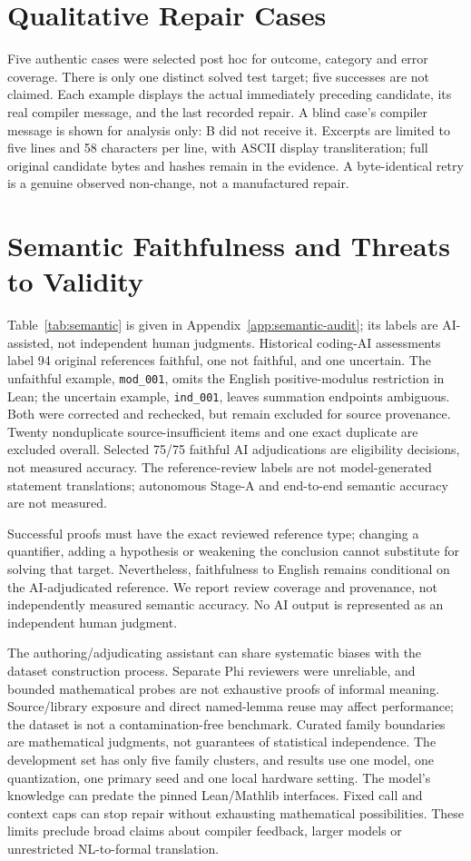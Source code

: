 \documentclass[runningheads,a4paper]{llncs}
\begin{document}
\section{Qualitative Repair Cases}
Five authentic cases were selected post hoc for outcome, category and error
coverage. There is only one distinct solved test target; five successes are not
claimed. Each example displays the actual immediately preceding candidate,
its real compiler message, and the last recorded repair. A blind case's compiler
message is shown for analysis only: B did not receive it. Excerpts are limited
to five lines and 58 characters per line, with ASCII display transliteration;
full original candidate bytes and hashes remain in the evidence. A byte-identical
retry is a genuine observed non-change, not a manufactured repair.

\section{Semantic Faithfulness and Threats to Validity}
Table~\ref{tab:semantic} is given in Appendix~\ref{app:semantic-audit};
its labels are AI-assisted, not independent human judgments.
Historical coding-AI assessments label 94 original references faithful, one
not faithful, and one uncertain. The unfaithful example, \texttt{mod\_001},
omits the English positive-modulus restriction in Lean; the uncertain example,
\texttt{ind\_001}, leaves summation endpoints ambiguous. Both were corrected
and rechecked, but remain excluded for source provenance. Twenty nonduplicate
source-insufficient items and one exact duplicate are excluded overall. Selected
75/75 faithful AI adjudications are eligibility decisions, not measured accuracy.
The reference-review labels are not model-generated statement translations;
autonomous Stage-A and end-to-end semantic accuracy are not measured.

Successful proofs must have the exact reviewed reference type; changing a
quantifier, adding a hypothesis or weakening the conclusion cannot substitute
for solving that target. Nevertheless, faithfulness to English remains
conditional on the AI-adjudicated reference. We report review coverage and
provenance, not independently measured semantic accuracy. No AI output is
represented as an independent human judgment.

The authoring/adjudicating assistant can share systematic biases with the
dataset construction process. Separate Phi reviewers were unreliable, and
bounded mathematical probes are not exhaustive proofs of informal meaning.
Source/library exposure and direct named-lemma reuse may affect performance;
the dataset is not a contamination-free benchmark. Curated family boundaries
are mathematical judgments, not guarantees of statistical independence. The
development set has only five family clusters, and results use one model,
one quantization, one primary seed and one local hardware setting. The model's
knowledge can predate the pinned Lean/Mathlib interfaces. Fixed call and context
caps can stop repair without exhausting mathematical possibilities. These
limits preclude broad claims about compiler feedback, larger models or
unrestricted NL-to-formal translation.
\end{document}
